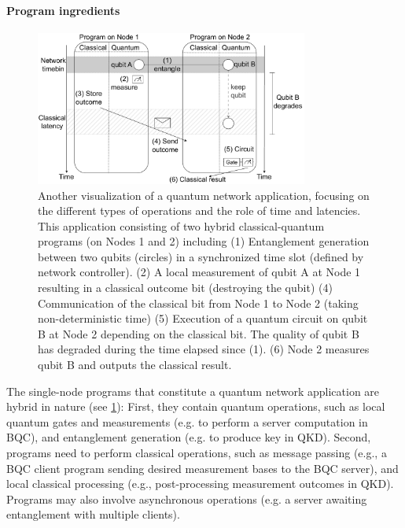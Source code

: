 \paragraph{Program ingredients}

\begin{figure}%
    \centering
    \includegraphics[width=0.8\textwidth]{figures/qoala/program_illustration.pdf}
    \caption{Another visualization of a quantum network application, focusing on the different types of operations and the role of time and latencies.
    This application consisting of two hybrid classical-quantum programs (on Nodes 1 and 2) including
        (1) Entanglement generation between two qubits (circles) in a synchronized time slot (defined by  network controller).
        (2) A local measurement of qubit A at Node 1 resulting in a classical outcome bit (destroying the qubit)
        (4) Communication of the classical bit from Node 1 to Node 2 (taking non-deterministic time)
        (5) Execution of a quantum circuit on qubit B at Node 2 depending on the classical bit. The quality of qubit B has degraded during the time elapsed since (1). 
        (6) Node 2 measures qubit B and outputs the classical result.
    }
    \label{background:fig:program_illustration}
\end{figure}

The single-node programs that constitute a quantum network application are hybrid in nature (see \cref{background:fig:program_illustration}):
First, they contain quantum operations, such as local quantum gates and measurements (e.g. to perform a server computation in BQC), and entanglement generation (e.g. to produce key in QKD).
Second, programs need to perform classical operations, such as message passing (e.g., a BQC client program sending desired measurement bases to the BQC server), and local classical processing (e.g., post-processing measurement outcomes in QKD).
Programs may also involve asynchronous operations (e.g. a server awaiting entanglement with multiple clients).

